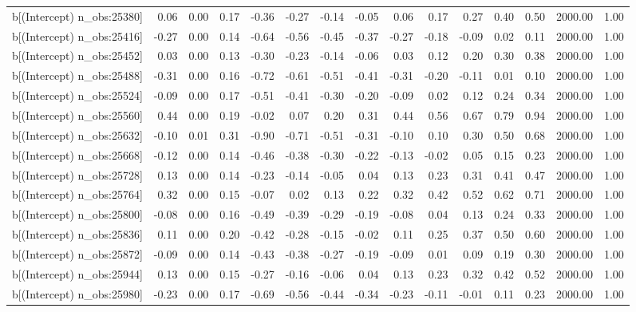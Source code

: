 \begin{table}[ht]
\begin{tabular}{rrrrrrrrrrrrrrr}
  b[(Intercept) n\_obs:25380] & 0.06 & 0.00 & 0.17 & -0.36 & -0.27 & -0.14 & -0.05 & 0.06 & 0.17 & 0.27 & 0.40 & 0.50 & 2000.00 & 1.00 \\ 
  b[(Intercept) n\_obs:25416] & -0.27 & 0.00 & 0.14 & -0.64 & -0.56 & -0.45 & -0.37 & -0.27 & -0.18 & -0.09 & 0.02 & 0.11 & 2000.00 & 1.00 \\ 
  b[(Intercept) n\_obs:25452] & 0.03 & 0.00 & 0.13 & -0.30 & -0.23 & -0.14 & -0.06 & 0.03 & 0.12 & 0.20 & 0.30 & 0.38 & 2000.00 & 1.00 \\ 
  b[(Intercept) n\_obs:25488] & -0.31 & 0.00 & 0.16 & -0.72 & -0.61 & -0.51 & -0.41 & -0.31 & -0.20 & -0.11 & 0.01 & 0.10 & 2000.00 & 1.00 \\ 
  b[(Intercept) n\_obs:25524] & -0.09 & 0.00 & 0.17 & -0.51 & -0.41 & -0.30 & -0.20 & -0.09 & 0.02 & 0.12 & 0.24 & 0.34 & 2000.00 & 1.00 \\ 
  b[(Intercept) n\_obs:25560] & 0.44 & 0.00 & 0.19 & -0.02 & 0.07 & 0.20 & 0.31 & 0.44 & 0.56 & 0.67 & 0.79 & 0.94 & 2000.00 & 1.00 \\ 
  b[(Intercept) n\_obs:25632] & -0.10 & 0.01 & 0.31 & -0.90 & -0.71 & -0.51 & -0.31 & -0.10 & 0.10 & 0.30 & 0.50 & 0.68 & 2000.00 & 1.00 \\ 
  b[(Intercept) n\_obs:25668] & -0.12 & 0.00 & 0.14 & -0.46 & -0.38 & -0.30 & -0.22 & -0.13 & -0.02 & 0.05 & 0.15 & 0.23 & 2000.00 & 1.00 \\ 
  b[(Intercept) n\_obs:25728] & 0.13 & 0.00 & 0.14 & -0.23 & -0.14 & -0.05 & 0.04 & 0.13 & 0.23 & 0.31 & 0.41 & 0.47 & 2000.00 & 1.00 \\ 
  b[(Intercept) n\_obs:25764] & 0.32 & 0.00 & 0.15 & -0.07 & 0.02 & 0.13 & 0.22 & 0.32 & 0.42 & 0.52 & 0.62 & 0.71 & 2000.00 & 1.00 \\ 
  b[(Intercept) n\_obs:25800] & -0.08 & 0.00 & 0.16 & -0.49 & -0.39 & -0.29 & -0.19 & -0.08 & 0.04 & 0.13 & 0.24 & 0.33 & 2000.00 & 1.00 \\ 
  b[(Intercept) n\_obs:25836] & 0.11 & 0.00 & 0.20 & -0.42 & -0.28 & -0.15 & -0.02 & 0.11 & 0.25 & 0.37 & 0.50 & 0.60 & 2000.00 & 1.00 \\ 
  b[(Intercept) n\_obs:25872] & -0.09 & 0.00 & 0.14 & -0.43 & -0.38 & -0.27 & -0.19 & -0.09 & 0.01 & 0.09 & 0.19 & 0.30 & 2000.00 & 1.00 \\ 
  b[(Intercept) n\_obs:25944] & 0.13 & 0.00 & 0.15 & -0.27 & -0.16 & -0.06 & 0.04 & 0.13 & 0.23 & 0.32 & 0.42 & 0.52 & 2000.00 & 1.00 \\ 
  b[(Intercept) n\_obs:25980] & -0.23 & 0.00 & 0.17 & -0.69 & -0.56 & -0.44 & -0.34 & -0.23 & -0.11 & -0.01 & 0.11 & 0.23 & 2000.00 & 1.00 \\ 

\end{tabular}
\end{table}
